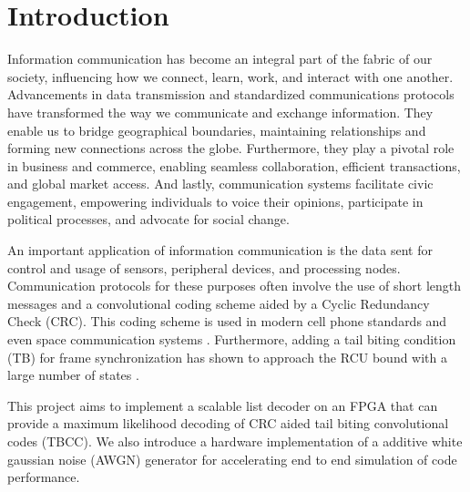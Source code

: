 \chapter{Introduction}
Information communication has become an integral part of the fabric of our society, influencing how we connect, learn, work, and interact with one another. Advancements in data transmission and standardized communications protocols have transformed the way we communicate and exchange information. They enable us to bridge geographical boundaries, maintaining relationships and forming new connections across the globe. Furthermore, they play a pivotal role in business and commerce, enabling seamless collaboration, efficient transactions, and global market access. And lastly, communication systems facilitate civic engagement, empowering individuals to voice their opinions, participate in political processes, and advocate for social change.

An important application of information communication is the data sent for control and usage of sensors, peripheral devices, and processing nodes. Communication protocols for these purposes often involve the use of short length messages and a convolutional coding scheme aided by a Cyclic Redundancy Check (CRC). This coding scheme is used in modern cell phone standards \cite{ETSI_conf} and even space communication systems \cite{Space_appl}. Furthermore, adding a tail biting condition (TB) for frame synchronization has shown to approach the RCU bound with a large number of states \cite{coskun}. 

This project aims to implement a scalable list decoder on an FPGA that can provide a maximum likelihood decoding of CRC aided tail biting convolutional codes (TBCC). We also introduce a hardware implementation of a additive white gaussian noise (AWGN) generator for accelerating end to end simulation of code performance.

